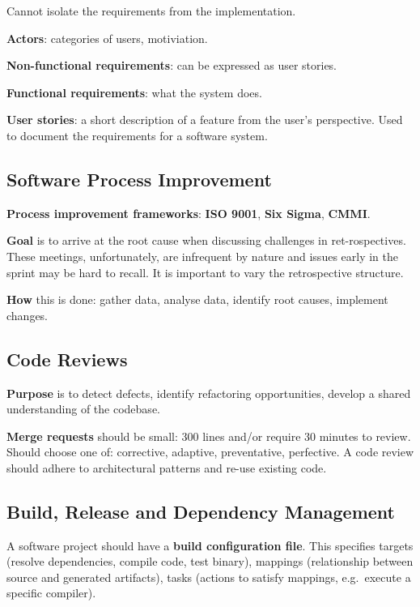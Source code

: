 \documentclass{article}
\begin{document}
\noindent Cannot isolate the requirements from the implementation.

\noindent \textbf{Actors}: categories of users, motiviation.

\noindent \textbf{Non-functional requirements}: can be expressed as user stories.

\noindent \textbf{Functional requirements}: what the system does.

\noindent \textbf{User stories}: a short description of a feature from the user's perspective. Used to document the requirements for a software system.


\subsection*{Software Process Improvement}

\noindent \textbf{Process improvement frameworks}: \textbf{ISO 9001}, \textbf{Six Sigma}, \textbf{CMMI}.

\noindent \textbf{Goal} is to arrive at the root cause when discussing challenges in ret-rospectives.
These meetings, unfortunately, are infrequent by nature and issues early in the sprint may be hard to recall.
It is important to vary the retrospective structure.

\noindent \textbf{How} this is done: gather data, analyse data, identify root causes, implement changes.


\subsection*{Code Reviews}

\noindent \textbf{Purpose} is to detect defects, identify refactoring opportunities, develop a shared understanding of the codebase.

\noindent \textbf{Merge requests} should be small: 300 lines and/or require 30 minutes to review.
Should choose one of: corrective, adaptive, preventative, perfective.
A code review should adhere to architectural patterns and re-use existing code.


\subsection*{Build, Release and Dependency Management}

\noindent A software project should have a \textbf{build configuration file}. This specifies targets (resolve dependencies, compile code, test binary),
mappings (relationship between source and generated artifacts), tasks (actions to satisfy mappings, e.g.\ execute a specific compiler).
\end{document}
